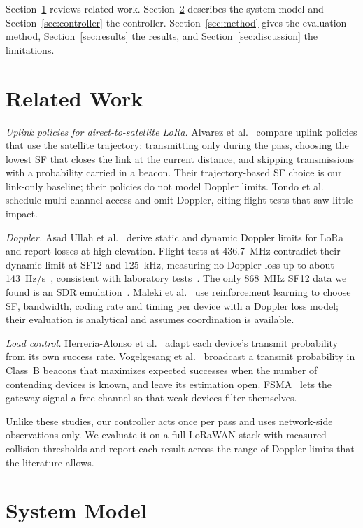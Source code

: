 \documentclass[journal]{IEEEtran}
\begin{document}
Section~\ref{sec:related} reviews related work. Section~\ref{sec:model} describes the system model and Section~\ref{sec:controller} the controller. Section~\ref{sec:method} gives the evaluation method, Section~\ref{sec:results} the results, and Section~\ref{sec:discussion} the limitations.

\section{Related Work}\label{sec:related}
\emph{Uplink policies for direct-to-satellite LoRa.} Alvarez et al.~\cite{alvarez2022} compare uplink policies that use the satellite trajectory: transmitting only during the pass, choosing the lowest SF that closes the link at the current distance, and skipping transmissions with a probability carried in a beacon. Their trajectory-based SF choice is our link-only baseline; their policies do not model Doppler limits. Tondo et al.~\cite{tondo2024} schedule multi-channel access and omit Doppler, citing flight tests that saw little impact.

\emph{Doppler.} Asad Ullah et al.~\cite{asadullah2024} derive static and dynamic Doppler limits for LoRa and report losses at high elevation. Flight tests at 436.7~MHz contradict their dynamic limit at SF12 and 125~kHz, measuring no Doppler loss up to about 143~Hz/s~\cite{zadorozhny2022}, consistent with laboratory tests~\cite{doroshkin2019}. The only 868~MHz SF12 data we found is an SDR emulation~\cite{colombo2022}. Maleki et al.~\cite{maleki2026} use reinforcement learning to choose SF, bandwidth, coding rate and timing per device with a Doppler loss model; their evaluation is analytical and assumes coordination is available.

\emph{Load control.} Herreria-Alonso et al.~\cite{herreria2023} adapt each device's transmit probability from its own success rate. Vogelgesang et al.~\cite{vogelgesang2021} broadcast a transmit probability in Class~B beacons that maximizes expected successes when the number of contending devices is known, and leave its estimation open. FSMA~\cite{fsma2026} lets the gateway signal a free channel so that weak devices filter themselves.

Unlike these studies, our controller acts once per pass and uses network-side observations only. We evaluate it on a full LoRaWAN stack with measured collision thresholds and report each result across the range of Doppler limits that the literature allows.

\section{System Model}\label{sec:model}
\end{document}
